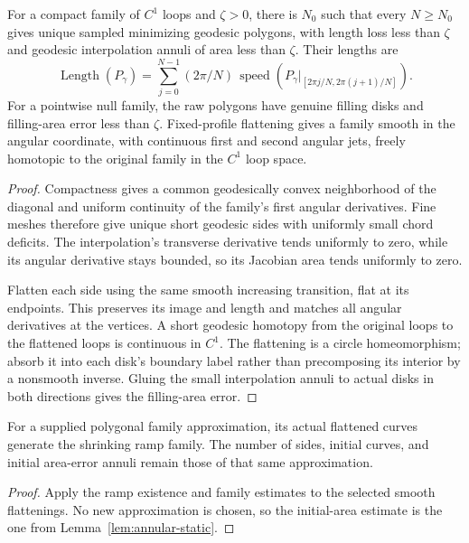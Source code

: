 \begin{lemma}\label{lem:annular-static}
For a compact family of $C^1$ loops and $\zeta>0$, there is $N_0$
such that every $N\geq N_0$ gives unique sampled minimizing geodesic
polygons, with length loss less than $\zeta$ and geodesic interpolation
annuli of area less than $\zeta$. Their lengths are
\begin{equation}
 \operatorname{Length}(P_\gamma)=
 \sum_{j=0}^{N-1}(2\pi/N)\,
 \operatorname{speed}(P_\gamma|_{[2\pi j/N,2\pi(j+1)/N]}).
 \label{eq:polygon-length}
\end{equation}
For a pointwise null family, the raw polygons have genuine filling
disks and filling-area error less than $\zeta$. Fixed-profile
flattening gives a family smooth in the angular coordinate, with
continuous first and second angular jets, freely homotopic to the
original family in the $C^1$ loop space.
\end{lemma}
\begin{proof}
Compactness gives a common geodesically convex neighborhood of the
diagonal and uniform continuity of the family's first angular
derivatives. Fine meshes therefore give unique short geodesic sides
with uniformly small chord deficits. The interpolation's transverse
derivative tends uniformly to zero, while its angular derivative
stays bounded, so its Jacobian area tends uniformly to zero.

Flatten each side using the same smooth increasing transition, flat
at its endpoints. This preserves its image and length and matches all
angular derivatives at the vertices. A short geodesic homotopy from
the original loops to the flattened loops is continuous in $C^1$.
The flattening is a circle homeomorphism; absorb it into each disk's
boundary label rather than precomposing its interior by a nonsmooth
inverse. Gluing the small interpolation annuli to actual disks in
both directions gives the filling-area error.
\end{proof}

\begin{lemma}\label{lem:annular-evolving}
For a supplied polygonal family approximation, its actual flattened
curves generate the shrinking ramp family. The number of sides,
initial curves, and initial area-error annuli remain those of that
same approximation.
\end{lemma}
\begin{proof}
Apply the ramp existence and family estimates to the selected smooth
flattenings. No new approximation is chosen, so the initial-area
estimate is the one from Lemma~\ref{lem:annular-static}.
\end{proof}

